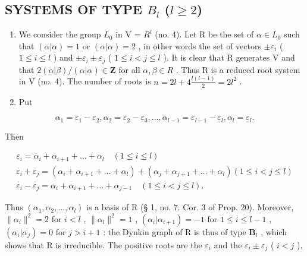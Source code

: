 \subsection{\texorpdfstring{SYSTEMS OF TYPE \(B_{l}\) (\(l \geqslant 2\))}{SYSTEMS OF TYPE B\_l (l >= 2)}}

\begin{enumerate}
\def\labelenumi{(\Roman{enumi})}
\item
  We consider the group \(L_{0}\) in V = \(R^{l}\) (no. 4). Let R be the set of \(\alpha \in L_{0}\) such that \((\alpha|\alpha) = 1\) or \((\alpha|\alpha) = 2\) , in other words the set of vectors \(\pm\varepsilon_{i}\) ( \(1 \leqslant i \leqslant l\) ) and \(\pm\varepsilon_{i} \pm \varepsilon_{j}\) ( \(1 \leqslant i < j \leqslant l\) ). It is clear that R generates V and that \(2(\alpha|\beta)/(\alpha|\alpha) \in \mathbf{Z}\) for all \(\alpha, \beta \in R\) . Thus R is a reduced root system in V (no. 4). The number of roots is \(n = 2l + 4\frac{l(l-1)}{2} = 2l^{2}\) .
\item
  Put
\end{enumerate}

\[
\alpha_ {1} = \varepsilon_ {1} - \varepsilon_ {2}, \alpha_ {2} = \varepsilon_ {2} - \varepsilon_ {3}, \dots , \alpha_ {l - 1} = \varepsilon_ {l - 1} - \varepsilon_ {l}, \alpha_ {l} = \varepsilon_ {l}.
\]

Then

\[
\begin{array}{c} \varepsilon_ {i} = \alpha_ {i} + \alpha_ {i + 1} + \dots + \alpha_ {l} \quad (1 \leqslant i \leqslant l) \\ \varepsilon_ {i} + \varepsilon_ {j} = (\alpha_ {i} + \alpha_ {i + 1} + \dots + \alpha_ {l}) + (\alpha_ {j} + \alpha_ {j + 1} + \dots + \alpha_ {l}) (1 \leqslant i <   j \leqslant l) \\ \varepsilon_ {i} - \varepsilon_ {j} = \alpha_ {i} + \alpha_ {i + 1} + \dots + \alpha_ {j - 1} \quad (1 \leqslant i <   j \leqslant l). \end{array}
\]

Thus \((\alpha_{1},\alpha_{2},\ldots ,\alpha_{l})\) is a basis of R (§ 1, no. 7. Cor. 3 of Prop. 20). Moreover, \(\| \alpha_{i}\|^{2} = 2\) for \(i < l\) , \(\| \alpha_l\| ^2 = 1\) , \((\alpha_i|\alpha_{i + 1}) = -1\) for \(1\leqslant i\leqslant l - 1\) , \((\alpha_i|\alpha_j) = 0\) for \(j > i + 1\) : the Dynkin graph of R is thus of type \(\mathbf{B}_l\) , which shows that R is irreducible. The positive roots are the \(\varepsilon_{i}\) and the \(\varepsilon_{i}\pm \varepsilon_{j}\) ( \(i < j\) ).

